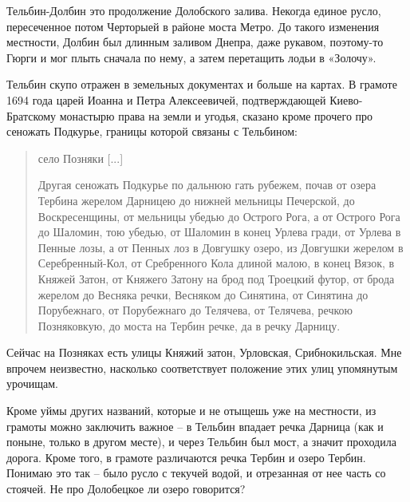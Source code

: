 Тельбин-Долбин это продолжение Долобского залива. Некогда единое русло, пересеченное потом Черторыей в районе моста Метро. До такого изменения местности, Долбин был длинным заливом Днепра, даже рукавом, поэтому-то Гюрги и мог плыть сначала по нему, а затем перетащить лодьи в «Золочу».




Тельбин скупо отражен в земельных документах и больше на картах. В грамоте 1694 года царей Иоанна и Петра Алексеевичей, подтверждающей Киево-Братскому монастырю права на земли и угодья, сказано кроме прочего про сеножать Подкурье, границы которой связаны с Тельбином:

\begin{quotation}
село Позняки [...]

Другая сеножать Подкурье по дальнюю гать рубежем, почав от озера Тербина жерелом Дарницею до нижней мельницы Печерской, до Воскресенщины, от мельницы убедью до Острого Рога, а от Острого Рога до Шаломин, тою убедью, от Шаломин в конец Урлева гради, от Урлева в Пенные лозы, а от Пенных лоз в Довгушку озеро, из Довгушки жерелом в Серебренный-Кол, от Сребренного Кола длиной малою, в конец Вязок, в Княжей Затон, от Княжего Затону на брод под Троецкий футор, от брода жерелом до Весняка речки, Весняком до Синятина, от Синятина до Порубежнаго, от Порубежнаго до Телячева, от Телячева, речкою Позняковкую, до моста на Тербин речке, да в речку Дарницу.
\end{quotation}

Сейчас на Позняках есть улицы Княжий затон, Урловская, Срибнокильская. Мне впрочем неизвестно, насколько соответствует положение этих улиц упомянутым урочищам.

Кроме уймы других названий, которые и не отыщешь уже на местности, из грамоты можно заключить важное – в Тельбин впадает речка Дарница (как и поныне, только в другом месте), и через Тельбин был мост, а значит проходила дорога. Кроме того, в грамоте различаются речка Тербин и озеро Тербин. Понимаю это так – было русло с текучей водой, и отрезанная от нее часть со стоячей. Не про Долобецкое ли озеро говорится?

